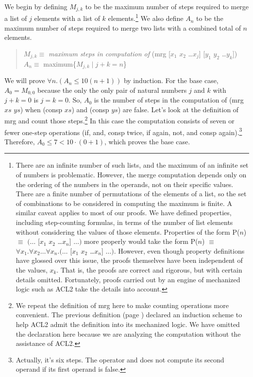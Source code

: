 We begin by defining $M_{j,k}$ to be the maximum number of steps required to merge a list
of $j$ elements with a list of $k$ elements.\footnote{There are an infinite number
of such lists, and the maximum of an infinite set of numbers is problematic.
However, the merge computation depends only
on the ordering of the numbers in the operands,
not on their specific values.
There are a finite number of permutations of the elements of a list,
so the set of combinations to be considered in computing the maximum is finite.
A similar caveat applies to most of our proofs.
We have defined properties, including step-counting formulas,
in terms of the number of list elements
without considering the values of those elements.
Properties of the form P($n$) $\equiv$ $(\dots$ [$x_1$ $x_2$ \dots $x_n$] $\dots)$
more properly would take the form
P($n$) $\equiv$ $\forall x_1.\forall x_2\dots\forall x_n.(\dots$ [$x_1$ $x_2$ \dots $x_n$] $\dots)$.
However, even though property definitions have glossed over this issue,
the proofs themselves have been independent of the values, $x_k$.
That is, the proofs are correct and rigorous, but with certain details omitted.
Fortunately, proofs carried out by an engine of
mechanized logic such as ACL2 take the details into account.}
We also define $A_n$ to be the maximum number of steps required to merge two lists
with a combined total of $n$ elements.
\begin{quote}
$M_{j,k} \equiv$ \emph{maximum steps in computation of} \textsf{(mrg [$x_1$ $x_2$ \dots $x_j$] [$y_1$ $y_2$ \dots $y_k$])} \\
$A_n \equiv$ maximum\{$M_{j,k} \mid j + k = n$\}
\end{quote}

We will
prove $\forall n.(A_n \leq 10(n+1))$ by induction.
For the base case, $A_0 = M_{0,0}$ because the only the only pair of natural
numbers $j$ and $k$ with $j + k = 0$ is $j = k = 0$.
So, $A_0$ is the number of steps in the computation of \textsf{(mrg $xs$ $ys$)}
when \textsf{(consp $xs$)} and \textsf{(consp $ys$)} are false.
Let's look at the definition of \textsf{mrg} and count those steps.\footnote{We
repeat the definition of \textsf{mrg} here to make counting operations more convenient.
The previous definition (page \pageref{defun:mrg})
declared an induction scheme to help ACL2
admit the definition into its mechanized logic.
We have omitted the declaration here because we are analyzing
the computation without the assistance of ACL2.}
In this case the computation consists of seven or fewer one-step operations
(\textsf{if}, \textsf{and}, \textsf{consp} twice,
\textsf{if} again, \textsf{not}, and \textsf{consp} again).\footnote{Actually,
it's six steps. The operator \textsf{and} does not compute its second operand
if its first operand is false.}
Therefore, $A_0 \leq 7 < 10\cdot(0 + 1)$, which proves the base case.

